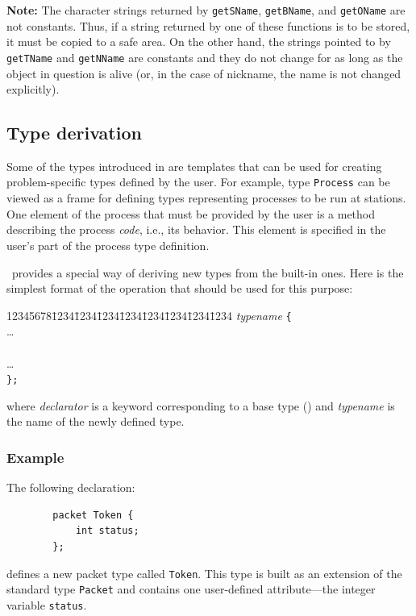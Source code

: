 \noindent
{\bf Note:} The character strings returned by {\tt getSName},
{\tt getBName}, and {\tt getOName} are not constants.
Thus, if a string returned by one of these functions is to be stored, it
must be copied to a safe area.
On the other hand,
the strings pointed to by {\tt getTName} and {\tt getNName} are
constants and
they do not change for as long as the object in question is alive (or,
in the case of nickname, the name is not changed explicitly).

\subsection {Type derivation}
\label{rm_st_td}

Some of the types introduced in 
are templates that
can be used for creating problem-specific types defined by the user.
For example, type {\tt Process} can be viewed as a frame for defining
types representing processes to be run at stations.
One element of the process that must be provided by the user is a method
describing the process {\em code}, i.e., its behavior.
This element is specified in the user's part of the process type
definition.

\smurph\ provides a special way of deriving new types from the built-in
ones.
Here is the
simplest format of the operation that should be used for this purpose:
{\tt\begin{tabbing}
12345678\=1234\=1234\=1234\=1234\=1234\=1234\=1234\=1234\kill
{} {\em typename\/} {\tt \{} \\
\> \>\ldots \\
\>  \\
\> \>\ldots \\
\> {\tt \};}
\end{tabbing}}
\noindent
where {\em declarator\/} is a keyword corresponding to a base {\smurph}
type () and {\em typename\/} is the name of the
newly defined type.

\subsubsection*{Example}

\noindent
The following declaration:
\begin{verbatim}
        packet Token {
            int status;
        };
\end{verbatim}
defines a new packet type called {\tt Token}.
This type is built as an extension of the standard type {\tt Packet} and
contains one user-defined attribute---the integer variable {\tt status}.

